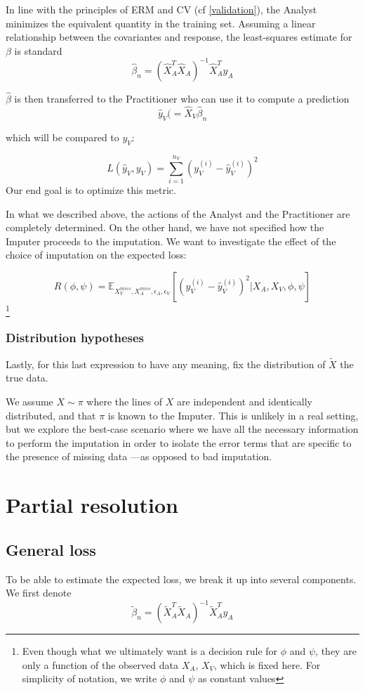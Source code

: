 In line with the principles of ERM and CV (cf \ref{validation}), the Analyst minimizes the equivalent quantity in the training set. Assuming a linear relationship between the covariantes and response, the least-squares estimate for $\beta$ is standard \cite{linear_regression}
$$
\hat{\beta}_n = (\hat{X}_A^T \hat{X}_A)^{-1} \hat{X}_A^T y_A 
$$

$\hat{\beta}$ is then transferred to the Practitioner who can use it to compute a prediction
$$\hat{y}_V (= \hat{X}_V \hat{\beta}_n $$

which will be compared to $y_V$:

$$L(\hat{y}_V, y_V) = \sum\limits_{i=1}^{n_V} (y_V^{(i)} - \hat{y}_V^{(i)})^2$$
Our end goal is to optimize this metric. 

In what we described above, the actions of the Analyst and the Practitioner are completely determined. On the other hand, we have not specified how the Imputer proceeds to the imputation. We want to investigate the effect of the choice of imputation on the expected loss:

$$R(\phi, \psi) = \mathbb{E}_{X_V^{miss}, X_A^{miss}, \epsilon_A, \epsilon_V}[(y_V^{(i)} - \hat{y}_V^{(i)})^2 \vert X_A, X_V, \phi, \psi]$$\footnote{Even though what we ultimately want is a decision rule for $\phi$ and $\psi$, they are only a function of the observed data $X_A$, $X_V$, which is fixed here. For simplicity of notation, we write $\phi$ and $\psi$ as constant values}


			\subsubsection{Distribution hypotheses}
Lastly, for this last expression to have any meaning, fix the distribution of $\tilde{X}$ the true data.

We assume $X \sim \pi$ where the lines of $X$ are independent and identically distributed, and that $\pi$ is known to the Imputer. This is unlikely in a real setting, but we explore the best-case scenario where we have all the necessary information to perform the imputation in order to isolate the error terms that are specific to the presence of missing data ---as opposed to bad imputation.

	\section{Partial resolution}
		\subsection{General loss}
To be able to estimate the expected loss, we break it up into several components. We first denote 
$$
\tilde{\beta}_n = (\tilde{X}_A^T \tilde{X}_A)^{-1} \tilde{X}_A^T y_A 
$$

